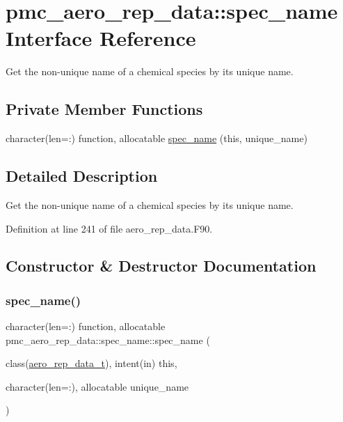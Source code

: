 \hypertarget{interfacepmc__aero__rep__data_1_1spec__name}{}\section{pmc\+\_\+aero\+\_\+rep\+\_\+data\+:\+:spec\+\_\+name Interface Reference}
\label{interfacepmc__aero__rep__data_1_1spec__name}


Get the non-\/unique name of a chemical species by its unique name.  


\subsection*{Private Member Functions}
\begin{DoxyCompactItemize}
\item 
character(len=\+:) function, allocatable \mbox{\hyperlink{interfacepmc__aero__rep__data_1_1spec__name_a773540720754f0f9386902985afb6054}{spec\+\_\+name}} (this, unique\+\_\+name)
\end{DoxyCompactItemize}


\subsection{Detailed Description}
Get the non-\/unique name of a chemical species by its unique name. 

Definition at line 241 of file aero\+\_\+rep\+\_\+data.\+F90.



\subsection{Constructor \& Destructor Documentation}
\mbox{\label{interfacepmc__aero__rep__data_1_1spec__name_a773540720754f0f9386902985afb6054}} 
\subsubsection{\texorpdfstring{spec\+\_\+name()}{spec\_name()}}
{\footnotesize\ttfamily character(len=\+:) function, allocatable pmc\+\_\+aero\+\_\+rep\+\_\+data\+::spec\+\_\+name\+::spec\+\_\+name (\begin{DoxyParamCaption}\item[{class(\mbox{\hyperlink{structpmc__aero__rep__data_1_1aero__rep__data__t}{aero\+\_\+rep\+\_\+data\+\_\+t}}), intent(in)}]{this,  }\item[{character(len=\+:), allocatable}]{unique\+\_\+name }\end{DoxyParamCaption})\hspace{0.3cm}{\ttfamily [private]}}

